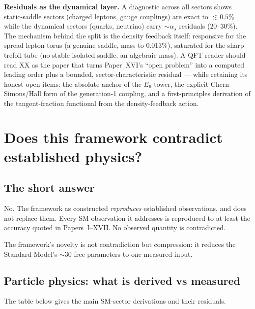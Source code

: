 \documentclass[11pt,a4paper]{article}
\begin{document}
\textbf{Residuals as the dynamical layer.}
A diagnostic across all sectors shows static-saddle sectors (charged leptons,
gauge couplings) are exact to $\lesssim0.5\%$ while the dynamical sectors
(quarks, neutrino) carry $\sim\alpha_s$ residuals ($20$--$30\%$). The mechanism
behind the split is the density feedback itself: responsive for the spread
lepton torus (a genuine saddle, mass to $0.013\%$), saturated for the sharp
trefoil tube (no stable isolated saddle, an algebraic mass). A QFT reader should
read XX as the paper that turns Paper~XVI's ``open problem'' into a computed
leading order plus a bounded, sector-characteristic residual --- while retaining
its honest open items: the absolute anchor of the $E_6$ tower, the explicit
Chern--Simons/Hall form of the generation-1 coupling, and a first-principles
derivation of the tangent-fraction functional from the density-feedback action.

\section{Does this framework contradict established physics?}
\label{RG:sec:consistency}

\subsection{The short answer}

No. The framework as constructed \emph{reproduces} established observations,
and does not replace them. Every SM observation it addresses is reproduced to at least
the accuracy quoted in Papers~I--XVII. No observed quantity is contradicted.

The framework's novelty is not contradiction but compression: it reduces the
Standard Model's $\sim30$ free parameters to one measured input.

\subsection{Particle physics: what is derived vs measured}

The table below gives the main SM-sector derivations and their residuals.
\end{document}
